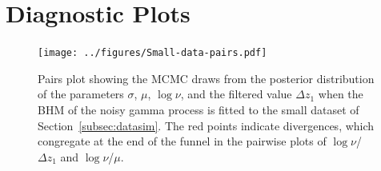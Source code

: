 \documentclass{article}
\begin{document}
\clearpage

\appendix

\section{Diagnostic Plots}\label{sec:ApdxA}

\begin{figure}[h]
    \centering
    \texttt{[image: ../figures/Small-data-pairs.pdf]}
    \caption{Pairs plot showing the MCMC draws from the posterior distribution of the parameters $\sigma$, $\mu$, $\log\nu$, and the filtered value $\Delta z_1$ when the BHM of the noisy gamma process is fitted to the small dataset of Section~\ref{subsec:datasim}. The red points indicate divergences, which congregate at the end of the funnel in the pairwise plots of $\log\nu$/$\Delta z_1$ and $\log\nu$/$\mu$.}\label{fig:small-data-pairs}
\end{figure}
\end{document}
